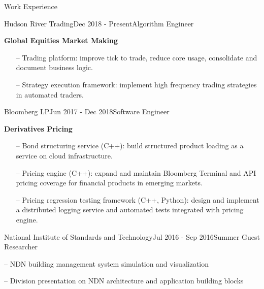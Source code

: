 \documentclass{resume} %
\begin{document}

\begin{rSection}{Work Experience}

\begin{rSubsection}{Hudson River Trading}{Dec 2018 - Present}{Algorithm Engineer}{}
\item \textbf{Global Equities Market Making}

\begin{itemize}[noitemsep,topsep=-6pt,leftmargin=1em]
\item[--] Trading platform: improve tick to trade, reduce core usage, consolidate and document business logic.
\item[--] Strategy execution framework: implement high frequency trading strategies in automated traders.
\end{itemize}

\end{rSubsection}

\begin{rSubsection}{Bloomberg LP}{Jun 2017 - Dec 2018}{Software Engineer}{}
\item \textbf{Derivatives Pricing}

\begin{itemize}[noitemsep,topsep=-6pt,leftmargin=1em]
\item[--] Bond structuring service (C++): build structured product loading as a service on cloud infrastructure.
\item[--] Pricing engine (C++): expand and maintain Bloomberg Terminal and API pricing coverage for financial products in emerging markets.
\item[--] Pricing regression testing framework (C++, Python): design and implement a distributed logging service and automated tests integrated with pricing engine.
\end{itemize}

\end{rSubsection}

\begin{rSubsection}{National Institute of Standards and Technology}{Jul 2016 - Sep 2016}{Summer Guest Researcher}{}
\item[--] NDN building management system simulation and visualization
\item[--] Division presentation on NDN architecture and application building blocks
\end{rSubsection}


\end{rSection}
\end{document}
